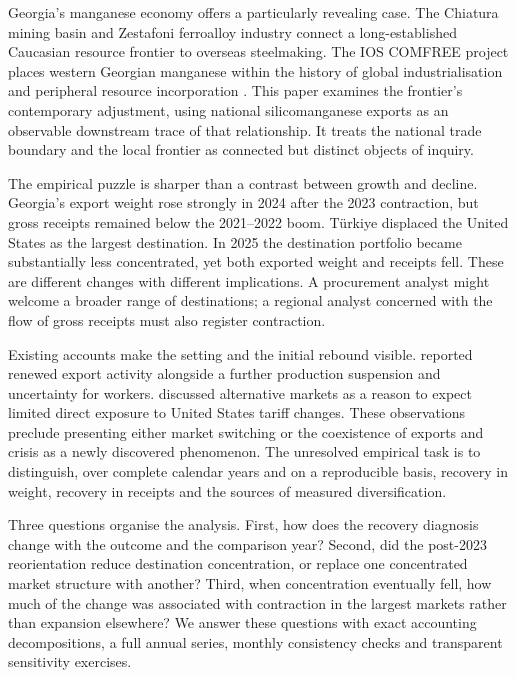 \documentclass[11pt,a4paper]{article}
\begin{document}
Georgia's manganese economy offers a particularly revealing case. The Chiatura mining basin and Zestafoni ferroalloy industry connect a long-established Caucasian resource frontier to overseas steelmaking. The IOS COMFREE project places western Georgian manganese within the history of global industrialisation and peripheral resource incorporation \citep{ioscomfree}. This paper examines the frontier's contemporary adjustment, using national silicomanganese exports as an observable downstream trace of that relationship. It treats the national trade boundary and the local frontier as connected but distinct objects of inquiry.

The empirical puzzle is sharper than a contrast between growth and decline. Georgia's export weight rose strongly in 2024 after the 2023 contraction, but gross receipts remained below the 2021--2022 boom. T\"urkiye displaced the United States as the largest destination. In 2025 the destination portfolio became substantially less concentrated, yet both exported weight and receipts fell. These are different changes with different implications. A procurement analyst might welcome a broader range of destinations; a regional analyst concerned with the flow of gross receipts must also register contraction.

Existing accounts make the setting and the initial rebound visible. \citet{civil2024} reported renewed export activity alongside a further production suspension and uncertainty for workers. \citet{shamugia2025} discussed alternative markets as a reason to expect limited direct exposure to United States tariff changes. These observations preclude presenting either market switching or the coexistence of exports and crisis as a newly discovered phenomenon. The unresolved empirical task is to distinguish, over complete calendar years and on a reproducible basis, recovery in weight, recovery in receipts and the sources of measured diversification.

Three questions organise the analysis. First, how does the recovery diagnosis change with the outcome and the comparison year? Second, did the post-2023 reorientation reduce destination concentration, or replace one concentrated market structure with another? Third, when concentration eventually fell, how much of the change was associated with contraction in the largest markets rather than expansion elsewhere? We answer these questions with exact accounting decompositions, a full annual series, monthly consistency checks and transparent sensitivity exercises.
\end{document}
